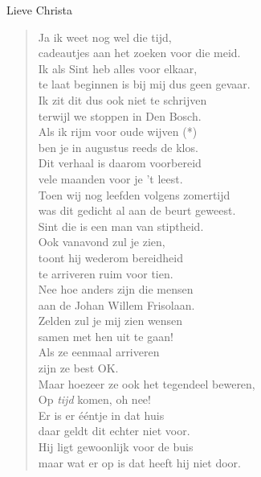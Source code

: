 \documentclass[12pt]{brief}
\date{12 augustus 2006}
\begin{document}
\begin{letter}{Lieve Christa}

\opening{}


\begin{verse}

Ja ik weet nog wel die tijd,\\
cadeautjes aan het zoeken voor die meid.\\
Ik als Sint heb alles voor elkaar,\\
te laat beginnen is bij mij dus geen gevaar.\\[1.5em]

Ik zit dit dus ook niet te schrijven\\
terwijl we stoppen in Den Bosch.\\
Als ik rijm voor oude wijven (*)\\
ben je in augustus reeds de klos.\\[1.5em]

Dit verhaal is daarom voorbereid\\
vele maanden voor je 't leest.\\
Toen wij nog leefden volgens zomertijd\\
was dit gedicht al aan de beurt geweest.\\[1.5em]

Sint die is een man van stiptheid.\\
Ook vanavond zul je zien,\\
toont hij wederom bereidheid\\
te arriveren ruim voor tien.\\[1.5em]

Nee hoe anders zijn die mensen\\
aan de Johan Willem Frisolaan.\\
Zelden zul je mij zien wensen\\
samen met hen uit te gaan!\\[1.5em]

Als ze eenmaal arriveren\\
zijn ze best OK.\\
Maar hoezeer ze ook het tegendeel beweren,\\
Op \emph{tijd} komen, oh nee!\\[1.5em]

Er is er \'e\'entje in dat huis\\
daar geldt dit echter niet voor.\\
Hij ligt gewoonlijk voor de buis\\
maar wat er op is dat heeft hij niet door.\\[1.5em]


\end{verse}
\end{letter}
\end{document}
